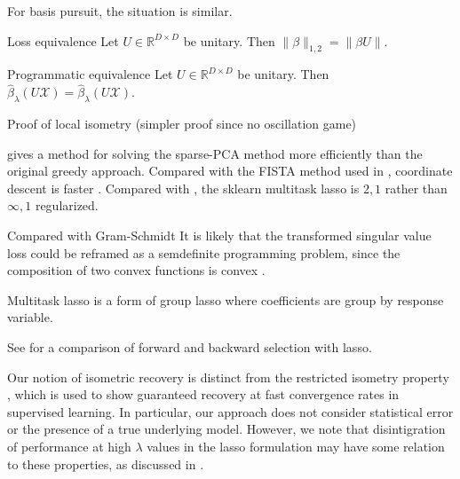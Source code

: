 \documentclass[a4paper,11pt]{article}
\begin{document}
For basis pursuit, the situation is similar.

 \begin{proposition}{Loss equivalence}
 \label{prop:basis_pursuit_loss_equivalence}
 Let $U \in \mathbb R^{D \times D}$ be unitary.
 Then $\|\beta\|_{1,2} = \|\beta U \|$.
\end{proposition}

 \begin{proposition}{Programmatic equivalence}
 \label{prop:basis_pursuit_loss_equivalence}
 Let $U \in \mathbb R^{D \times D}$ be unitary.
 Then $\hat \beta_{\lambda}  (U \mathcal X) = \hat \beta_{\lambda}  (U \mathcal X)$.
\end{proposition}


Proof of local isometry (simpler proof since no oscillation game)


\cite{Bertsimas2022-qo} gives a method for solving the sparse-PCA method more efficiently than the original greedy approach.
Compared with the FISTA method used in  \cite{Koelle2022-ju, Koelle2024-no}, coordinate descent \cite{Friedman-2007-yb, Meier2008-ts, Qin2013-tx} is faster \cite{Catalina2018-ek, Zhao2023-xn}.
Compared with \cite{Liu2009-yo}, the sklearn multitask lasso is $2,1$ rather than $\infty,1$ regularized.

Compared with Gram-Schmidt
It is likely that the transformed singular value loss could be reframed as a semdefinite programming problem, since the composition of two convex functions is convex \cite{Boyd2004-ql}.

Multitask lasso \cite{Obozinski2006-kq, Yeung2011-fg} is a form of group lasso \cite{Yuan2006-bt} where coefficients are group by response variable.

See \cite{Obozinski2006-kq} for a comparison of forward and backward selection with lasso.

Our notion of isometric recovery is distinct from the restricted isometry property \cite{Candes2005-dd, Hastie2015-qa}, which is used to show guaranteed recovery at fast convergence rates in supervised learning.
In particular, our approach does not consider statistical error or the presence of a true underlying model.
However, we note that disintigration of performance at high $\lambda$ values in the lasso formulation may have some relation to these properties, as discussed in \cite{Koelle2022-ju, Koelle2024-no}.
\end{document}
